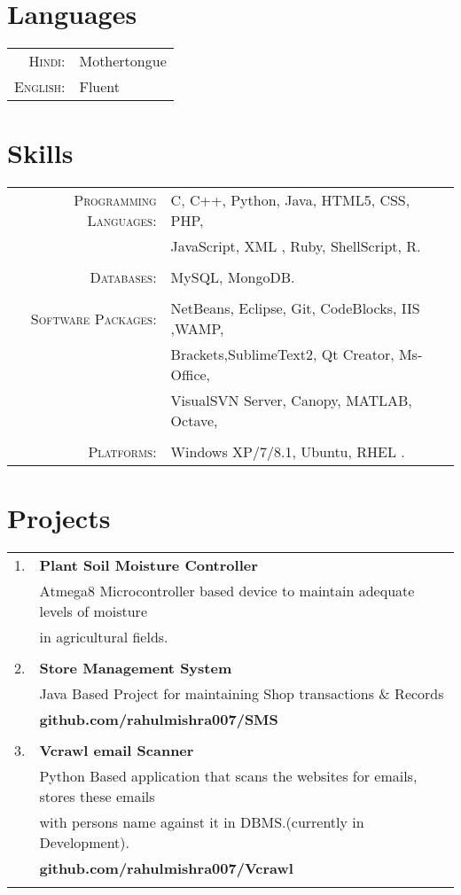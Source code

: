 \documentclass[a4paper,10pt]{article}
\begin{document}
\section{Languages}
\begin{tabular}{rl}
 \textsc{Hindi:}&Mothertongue\\
\textsc{English:}&Fluent\\
\end{tabular}

\section{Skills }
\begin{tabular}{rl}
 \textsc{Programming Languages:}& C, C++, Python, Java, HTML5, CSS, PHP,\\ & JavaScript, XML , Ruby, ShellScript, R.
 \\ &\\
  \textsc{Databases:}&  MySQL, MongoDB.
 \\ &\\
\textsc{Software Packages:}& NetBeans, Eclipse, Git, CodeBlocks, IIS ,WAMP, \\& Brackets,SublimeText2, Qt Creator, Ms-Office, \\ & VisualSVN Server, Canopy, MATLAB, Octave, \\&\\
\textsc{Platforms:}& Windows XP/7/8.1, Ubuntu, RHEL .\\
\end{tabular}

\section{Projects}
\begin{tabular}{rl}
 \textsc{1.} & {\normalsize\textbf{Plant Soil Moisture Controller}}\\ & \textsc Atmega8 Microcontroller based device to maintain adequate levels of moisture \\ & in agricultural fields.\\ & \\
 \textsc{2.} & {\normalsize\textbf{ Store Management System}}\\ & \textsc Java Based Project for maintaining Shop transactions \& Records \\ & \normalsize\textbf{github.com/rahulmishra007/SMS}\\ & \\ 
 \textsc{3.} & {\normalsize\textbf{Vcrawl email Scanner}}\\ & \textsc Python Based application that scans the websites for emails, stores these emails \\ & with persons name against it in DBMS.(currently in Development). \\ &
 \normalsize\textbf{github.com/rahulmishra007/Vcrawl}\\ & \\
 
\end{tabular}
\end{document}
